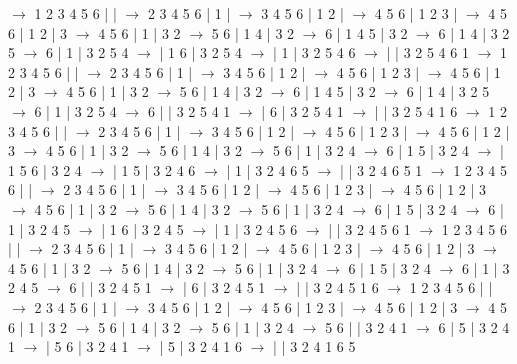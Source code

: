 \documentclass{article}
\begin{document}
\newline
 $\rightarrow$ 1 2 3 4 5 6 |  |  $\rightarrow$ 2 3 4 5 6 | 1 |  $\rightarrow$ 3 4 5 6 | 1 2 |  $\rightarrow$ 4 5 6 | 1 2 3 |  $\rightarrow$ 4 5 6 | 1 2 | 3 $\rightarrow$ 4 5 6 | 1 | 3 2 $\rightarrow$ 5 6 | 1 4 | 3 2 $\rightarrow$ 6 | 1 4 5 | 3 2 $\rightarrow$ 6 | 1 4 | 3 2 5 $\rightarrow$ 6 | 1 | 3 2 5 4 $\rightarrow$  | 1 6 | 3 2 5 4 $\rightarrow$  | 1 | 3 2 5 4 6 $\rightarrow$  |  | 3 2 5 4 6 1
\newline
 $\rightarrow$ 1 2 3 4 5 6 |  |  $\rightarrow$ 2 3 4 5 6 | 1 |  $\rightarrow$ 3 4 5 6 | 1 2 |  $\rightarrow$ 4 5 6 | 1 2 3 |  $\rightarrow$ 4 5 6 | 1 2 | 3 $\rightarrow$ 4 5 6 | 1 | 3 2 $\rightarrow$ 5 6 | 1 4 | 3 2 $\rightarrow$ 6 | 1 4 5 | 3 2 $\rightarrow$ 6 | 1 4 | 3 2 5 $\rightarrow$ 6 | 1 | 3 2 5 4 $\rightarrow$ 6 |  | 3 2 5 4 1 $\rightarrow$  | 6 | 3 2 5 4 1 $\rightarrow$  |  | 3 2 5 4 1 6
\newline
 $\rightarrow$ 1 2 3 4 5 6 |  |  $\rightarrow$ 2 3 4 5 6 | 1 |  $\rightarrow$ 3 4 5 6 | 1 2 |  $\rightarrow$ 4 5 6 | 1 2 3 |  $\rightarrow$ 4 5 6 | 1 2 | 3 $\rightarrow$ 4 5 6 | 1 | 3 2 $\rightarrow$ 5 6 | 1 4 | 3 2 $\rightarrow$ 5 6 | 1 | 3 2 4 $\rightarrow$ 6 | 1 5 | 3 2 4 $\rightarrow$  | 1 5 6 | 3 2 4 $\rightarrow$  | 1 5 | 3 2 4 6 $\rightarrow$  | 1 | 3 2 4 6 5 $\rightarrow$  |  | 3 2 4 6 5 1
\newline
 $\rightarrow$ 1 2 3 4 5 6 |  |  $\rightarrow$ 2 3 4 5 6 | 1 |  $\rightarrow$ 3 4 5 6 | 1 2 |  $\rightarrow$ 4 5 6 | 1 2 3 |  $\rightarrow$ 4 5 6 | 1 2 | 3 $\rightarrow$ 4 5 6 | 1 | 3 2 $\rightarrow$ 5 6 | 1 4 | 3 2 $\rightarrow$ 5 6 | 1 | 3 2 4 $\rightarrow$ 6 | 1 5 | 3 2 4 $\rightarrow$ 6 | 1 | 3 2 4 5 $\rightarrow$  | 1 6 | 3 2 4 5 $\rightarrow$  | 1 | 3 2 4 5 6 $\rightarrow$  |  | 3 2 4 5 6 1
\newline
 $\rightarrow$ 1 2 3 4 5 6 |  |  $\rightarrow$ 2 3 4 5 6 | 1 |  $\rightarrow$ 3 4 5 6 | 1 2 |  $\rightarrow$ 4 5 6 | 1 2 3 |  $\rightarrow$ 4 5 6 | 1 2 | 3 $\rightarrow$ 4 5 6 | 1 | 3 2 $\rightarrow$ 5 6 | 1 4 | 3 2 $\rightarrow$ 5 6 | 1 | 3 2 4 $\rightarrow$ 6 | 1 5 | 3 2 4 $\rightarrow$ 6 | 1 | 3 2 4 5 $\rightarrow$ 6 |  | 3 2 4 5 1 $\rightarrow$  | 6 | 3 2 4 5 1 $\rightarrow$  |  | 3 2 4 5 1 6
\newline
 $\rightarrow$ 1 2 3 4 5 6 |  |  $\rightarrow$ 2 3 4 5 6 | 1 |  $\rightarrow$ 3 4 5 6 | 1 2 |  $\rightarrow$ 4 5 6 | 1 2 3 |  $\rightarrow$ 4 5 6 | 1 2 | 3 $\rightarrow$ 4 5 6 | 1 | 3 2 $\rightarrow$ 5 6 | 1 4 | 3 2 $\rightarrow$ 5 6 | 1 | 3 2 4 $\rightarrow$ 5 6 |  | 3 2 4 1 $\rightarrow$ 6 | 5 | 3 2 4 1 $\rightarrow$  | 5 6 | 3 2 4 1 $\rightarrow$  | 5 | 3 2 4 1 6 $\rightarrow$  |  | 3 2 4 1 6 5
\end{document}
